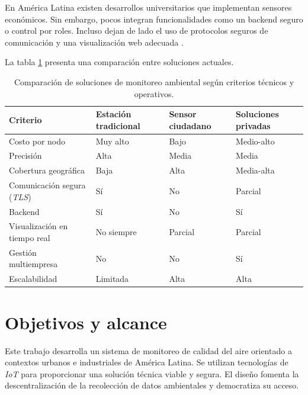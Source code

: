 En América Latina existen desarrollos universitarios que implementan sensores económicos. Sin embargo, pocos integran funcionalidades como un backend seguro o control por roles. Incluso dejan de lado el uso de protocolos seguros de comunicación y una visualización web adecuada \cite{Alvarez:2021, FIUBA:2023}.

La tabla \ref{tab:comparacion-soluciones} presenta una comparación entre soluciones actuales.

\begin{table}[h]
	\centering
	\caption[Comparación resumida de soluciones de monitoreo]{Comparación de soluciones de monitoreo ambiental según criterios técnicos y operativos.}
	\label{tab:comparacion-soluciones}
	\begin{tabular}{p{4cm} p{2cm} p{2cm} p{2.2cm}}
		\toprule
		\textbf{Criterio} & \textbf{Estación tradicional} & \textbf{Sensor ciudadano} & \textbf{Soluciones privadas} \\
		\midrule
		Costo por nodo               & Muy alto   & Bajo         & Medio-alto \\
		Precisión                    & Alta       & Media        & Media \\
		Cobertura geográfica         & Baja       & Alta         & Media-alta \\
		Comunicación segura (\textit{TLS})    & Sí         & No           & Parcial \\
		Backend             & Sí         & No           & Sí \\
		Visualización en tiempo real & No siempre & Parcial      & Parcial \\
		Gestión multiempresa         & No         & No           & Sí \\
		Escalabilidad                & Limitada   & Alta         & Alta \\
		\bottomrule
	\end{tabular}
\end{table}


\section{Objetivos y alcance}

Este trabajo desarrolla un sistema de monitoreo de calidad del aire orientado a contextos urbanos e industriales de América Latina. Se utilizan tecnologías de \textit{IoT} para proporcionar una solución técnica viable y segura. El diseño fomenta la descentralización de la recolección de datos ambientales y democratiza su acceso.

